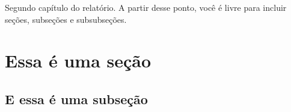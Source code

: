 
Segundo capítulo do relatório. A partir desse ponto, você é livre para incluir seções, subseções e subsubseções.

\section{Essa é uma seção}\label{sec:teste}

\lipsum[2-3]

\subsection{E essa é uma subseção}\label{subsec:teste}

\lipsum[5-8]
